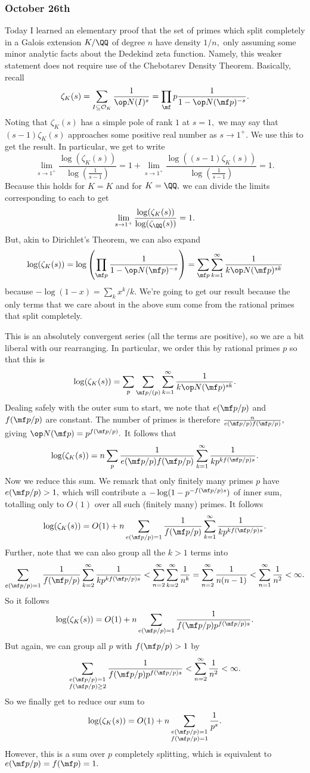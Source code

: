 \subsubsection{October 26th}
Today I learned an elementary proof that the set of primes which split completely in a Galois extension $K/\QQ$ of degree $n$ have density $1/n,$ only assuming some minor analytic facts about the Dedekind zeta function. Namely, this weaker statement does not require use of the Chebotarev Density Theorem. Basically, recall
\[\zeta_K(s)=\sum_{I\subseteq\mathcal O_K}\frac1{\op N(I)^s}=\prod_\mf p\frac1{1-\op N(\mf p)^{-s}}.\]
Noting that $\zeta_K(s)$ has a simple pole of rank $1$ at $s=1,$ we may say that $(s-1)\zeta_K(s)$ approaches some positive real number as $s\to1^+.$ We use this to get the result. In particular, we get to write
\[\lim_{s\to1^+}\frac{\log(\zeta_K(s))}{\log\left(\frac1{s-1}\right)}=1+\lim_{s\to1^+}\frac{\log((s-1)\zeta_K(s))}{\log\left(\frac1{s-1}\right)}=1.\]
Because this holds for $K=K$ and for $K=\QQ,$ we can divide the limits corresponding to each to get
\[\lim_{s\to1^+}\frac{\log(\zeta_K(s))}{\log(\zeta_\QQ(s))}=1.\]
But, akin to Dirichlet's Theorem, we can also expand
\[\log(\zeta_K(s))=\log\left(\prod_{\mf p}\frac1{1-\op N(\mf p)^{-s}}\right)=\sum_{\mf p}\sum_{k=1}^\infty\frac1{k\op N(\mf p)^{sk}}\]
because $-\log(1-x)=\sum_kx^k/k.$ We're going to get our result because the only terms that we care about in the above sum come from the rational primes that split completely.

This is an absolutely convergent series (all the terms are positive), so we are a bit liberal with our rearranging. In particular, we order this by rational primes $p$ so that this is
\[\log(\zeta_K(s))=\sum_p\sum_{\mf p/(p)}\sum_{k=1}^\infty\frac1{k\op N(\mf p)^{sk}}.\]
Dealing safely with the outer sum to start, we note that $e(\mf p/p)$ and $f(\mf p/p)$ are constant. The number of primes is therefore $\frac n{e(\mf p/p)f(\mf p/p)},$ giving $\op N(\mf p)=p^{f(\mf p/p)}.$ It follows that
\[\log(\zeta_K(s))=n\sum_p\frac1{e(\mf p/p)f(\mf p/p)}\sum_{k=1}^\infty\frac1{kp^{kf(\mf p/p)s}}.\]
Now we reduce this sum. We remark that only finitely many primes $p$ have $e(\mf p/p)>1,$ which will contribute a $-\log(1-p^{-f(\mf p/p)s})$ of inner sum, totalling only to $O(1)$ over all such (finitely many) primes. It follows
\[\log(\zeta_K(s))=O(1)+n\sum_{e(\mf p/p)=1}\frac1{f(\mf p/p)}\sum_{k=1}^\infty\frac1{kp^{kf(\mf p/p)s}}.\]
Further, note that we can also group all the $k>1$ terms into
\[\sum_{e(\mf p/p)=1}\frac1{f(\mf p/p)}\sum_{k=2}^\infty\frac1{kp^{kf(\mf p/p)s}}<\sum_{n=2}^\infty\sum_{k=2}^\infty\frac1{n^k}=\sum_{n=2}^\infty\frac1{n(n-1)}<\sum_{n=1}^\infty\frac1{n^2}<\infty.\]
So it follows
\[\log(\zeta_K(s))=O(1)+n\sum_{e(\mf p/p)=1}\frac1{f(\mf p/p)p^{f(\mf p/p)s}}.\]
But again, we can group all $p$ with $f(\mf p/p)>1$ by
\[\sum_{\substack{e(\mf p/p)=1\\f(\mf p/p)\ge2}}\frac1{f(\mf p/p)p^{f(\mf p/p)s}}<\sum_{n=2}^\infty\frac1{n^2}<\infty.\]
So we finally get to reduce our sum to
\[\log(\zeta_K(s))=O(1)+n\sum_{\substack{e(\mf p/p)=1\\f(\mf p/p)=1}}\frac1{p^s}.\]
However, this is a sum over $p$ completely splitting, which is equivalent to $e(\mf p/p)=f(\mf p)=1.$


